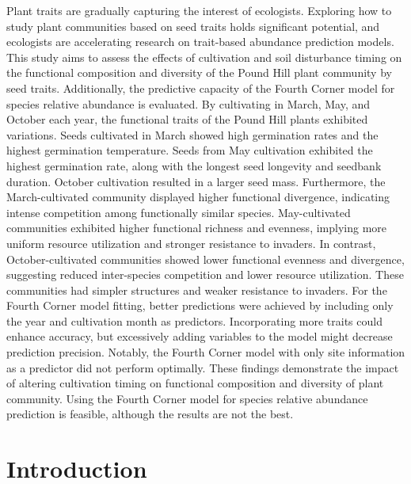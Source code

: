 \documentclass[a4paper, 11, margin=2cm]{article}
\begin{document}
    Plant traits are gradually capturing the interest of ecologists. Exploring how to study plant communities based on seed traits holds significant potential, and ecologists are accelerating research on trait-based abundance prediction models. This study aims to assess the effects of cultivation and soil disturbance timing on the functional composition and diversity of the Pound Hill plant community by seed traits. Additionally, the predictive capacity of the Fourth Corner model for species relative abundance is evaluated. By cultivating in March, May, and October each year, the functional traits of the Pound Hill plants exhibited variations. Seeds cultivated in March showed high germination rates and the highest germination temperature. Seeds from May cultivation exhibited the highest germination rate, along with the longest seed longevity and seedbank duration. October cultivation resulted in a larger seed mass. Furthermore, the March-cultivated community displayed higher functional divergence, indicating intense competition among functionally similar species. May-cultivated communities exhibited higher functional richness and evenness, implying more uniform resource utilization and stronger resistance to invaders. In contrast, October-cultivated communities showed lower functional evenness and divergence, suggesting reduced inter-species competition and lower resource utilization. These communities had simpler structures and weaker resistance to invaders. For the Fourth Corner model fitting, better predictions were achieved by including only the year and cultivation month as predictors. Incorporating more traits could enhance accuracy, but excessively adding variables to the model might decrease prediction precision. Notably, the Fourth Corner model with only site information as a predictor did not perform optimally. These findings demonstrate the impact of altering cultivation timing on functional composition and diversity of plant community. Using the Fourth Corner model for species relative abundance prediction is feasible, although the results are not the best.


    \section{Introduction}
\end{document}
